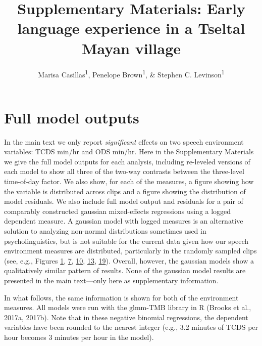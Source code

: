 \documentclass[floatsintext,man]{apa6}
\title{Supplementary Materials: Early language experience in a Tseltal Mayan
village}
\author{Marisa Casillas\textsuperscript{1}, Penelope Brown\textsuperscript{1}, \& Stephen C. Levinson\textsuperscript{1}}
\affiliation{
    \vspace{0.5cm}
          \textsuperscript{1} Max Planck Institute for Psycholinguistics  }
\theoremstyle{definition}
\theoremstyle{definition}
\theoremstyle{definition}
\theoremstyle{remark}
\begin{document}
\maketitle

\setcounter{secnumdepth}{0}



\section{Full model outputs}\label{models}

In the main text we only report \emph{significant} effects on two speech
environment variables: TCDS min/hr and ODS min/hr. Here in the
Supplementary Materials we give the full model outputs for each
analysis, including re-leveled versions of each model to show all three
of the two-way contrasts between the three-level time-of-day factor. We
also show, for each of the measures, a figure showing how the variable
is distributed across clips and a figure showing the distribution of
model residuals. We also include full model output and residuals for a
pair of comparably constructed gaussian mixed-effects regressions using
a logged dependent measure. A gaussian model with logged measures is an
alternative solution to analyzing non-normal distributions sometimes
used in psycholinguistics, but is not suitable for the current data
given how our speech environment measures are distributed, particularly
in the randomly sampled clips (see, e.g., Figures
\protect\hyperlink{fig1}{1}, \protect\hyperlink{fig7}{7},
\protect\hyperlink{fig10}{10}, \protect\hyperlink{fig13}{13},
\protect\hyperlink{fig19}{19}). Overall, however, the gaussian models
show a qualitatively similar pattern of results. None of the gaussian
model results are presented in the main text---only here as
supplementary information.

In what follows, the same information is shown for both of the
environment measures. All models were run with the glmm-TMB library in R
(Brooks et al., 2017a, 2017b). Note that in these negative binomial
regressions, the dependent variables have been rounded to the nearest
integer (e.g., 3.2 minutes of TCDS per hour becomes 3 minutes per hour
in the model).
\end{document}
